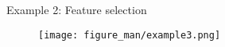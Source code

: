 \documentclass[11pt,compress,t,notes=noshow, xcolor=table]{beamer}
\begin{document}
\begin{vbframe}{Example 2: Feature selection}






\begin{center}
\begin{figure}
    \texttt{[image: figure\_man/example3.png]}
\end{figure}
\end{center}











\end{vbframe}
\end{document}
